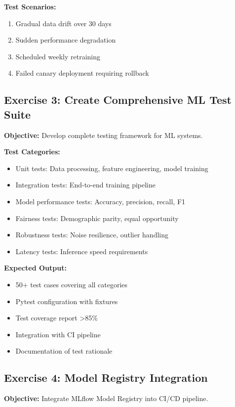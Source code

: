 \textbf{Test Scenarios:}
\begin{enumerate}
    \item Gradual data drift over 30 days
    \item Sudden performance degradation
    \item Scheduled weekly retraining
    \item Failed canary deployment requiring rollback
\end{enumerate}

\subsection{Exercise 3: Create Comprehensive ML Test Suite}

\textbf{Objective:} Develop complete testing framework for ML systems.

\textbf{Test Categories:}
\begin{itemize}
    \item Unit tests: Data processing, feature engineering, model training
    \item Integration tests: End-to-end training pipeline
    \item Model performance tests: Accuracy, precision, recall, F1
    \item Fairness tests: Demographic parity, equal opportunity
    \item Robustness tests: Noise resilience, outlier handling
    \item Latency tests: Inference speed requirements
\end{itemize}

\textbf{Expected Output:}
\begin{itemize}
    \item 50+ test cases covering all categories
    \item Pytest configuration with fixtures
    \item Test coverage report >85\%
    \item Integration with CI pipeline
    \item Documentation of test rationale
\end{itemize}

\subsection{Exercise 4: Model Registry Integration}

\textbf{Objective:} Integrate MLflow Model Registry into CI/CD pipeline.


